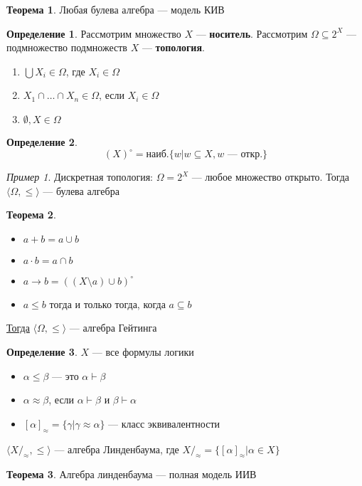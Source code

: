 \documentclass[english]{article}
\newcounter{propertycnt}
\newcommand{\beginproperty}{\setcounter{propertycnt}{1}}
\theoremstyle{plain}
\newenvironment{property}{
  \renewcommand\thepropertyinner{\arabic{propertycnt}}
  \propertyinner
}{\endpropertyinner\stepcounter{propertycnt}}
\theoremstyle{remark}
\newtheorem*{examp}{Пример}
\theoremstyle{definition}
\newtheorem{theorem}{Теорема}[section]
\newtheorem*{definition}{Определение}
\begin{document}
\begin{theorem}
Любая булева алгебра --- модель КИВ
\end{theorem}
\begin{definition}
Рассмотрим множество \(X\) --- \textbf{носитель}. Рассмотрим \(\Omega \subseteq 2^X\) --- подмножество подмножеств \(X\) --- \textbf{топология}.
\begin{enumerate}
\item \(\bigcup X_i \in \Omega\), где \(X_i \in \Omega\)
\item \(X_1 \cap \dots \cap X_n \in \Omega\), если \(X_i \in \Omega\)
\item \(\emptyset, X \in \Omega\)
\end{enumerate}
\label{org83b1676}
\end{definition}
\begin{definition}
\[ (X)^\circ = \text{наиб.}\{w \big| w \subseteq X, w\text{ --- откр.}\}\]
\label{org10bf03a}
\end{definition}
\begin{examp}
Дискретная топология: \(\Omega = 2^X\) --- любое множество открыто. Тогда \(\langle \Omega, \le \rangle\) --- булева алгебра
\label{orgb39b534}
\end{examp}
\begin{theorem}
\-
\begin{itemize}
\item \(a + b = a \cup b\)
\item \(a \cdot b = a \cap b\)
\item \(a \to b = \left((X \setminus a) \cup b\right)^\circ\)
\item \(a \le b\) тогда и только тогда, когда \(a \subseteq b\)
\end{itemize}
\uline{Тогда} \(\langle \Omega, \le \rangle\) --- алгебра Гейтинга
\label{org8f6529a}
\end{theorem}
\begin{definition}
\(X\) --- все формулы логики
\begin{itemize}
\item \(\alpha \le \beta\) --- это \(\alpha \vdash \beta\)
\item \(\alpha \approx \beta\), если \(\alpha \vdash \beta\) и \(\beta \vdash \alpha\)
\item \([\alpha]_\approx = \{\gamma \big| \gamma \approx \alpha\}\) --- класс эквивалентности
\end{itemize}
\label{orgaa05791}
\end{definition}
\beginproperty
\begin{property}
\(\langle X/_\approx, \le \rangle\) --- алгебра Линденбаума, где \(X/_\approx = \{[\alpha]_\approx \big| \alpha \in X\}\)
\label{org00a4b0b}
\end{property}
\begin{theorem}
Алгебра линденбаума --- полная модель ИИВ
\end{theorem}
\end{document}
